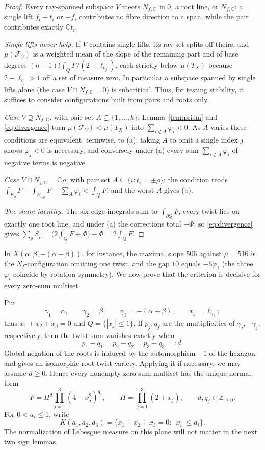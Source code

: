 \documentclass[11pt]{amsart}
\theoremstyle{definition}
\theoremstyle{remark}
\newcommand{\CC}{\mathbb{C}}
\newcommand{\ZZ}{\mathbb{Z}}
\begin{document}
\begin{proof}
Every ray-spanned subspace $V$ meets $N_{f,\CC}$ in $0$, a root line, or
$N_{f,\CC}$: a single lift $f_i + t_i$ or $-f_i$ contributes no fibre
direction to a span, while the pair contributes exactly $\CC t_i$.

\emph{Single lifts never help.} If $V$ contains single lifts, its ray
set splits off theirs, and $\mu(\mathcal{F}_V)$ is a weighted mean of
the slope of the remaining part and of base degrees
$(n-1)!\int_Q F/(2+\ell_{t_j})$, each strictly below $\mu(T_X)$ because
$2 + \ell_{t_j} > 1$ off a set of measure zero. In particular a subspace
spanned by single lifts alone (the case $V \cap N_{f,\CC} = 0$) is
subcritical. Thus, for testing stability, it suffices to consider
configurations built from pairs and roots only.

\emph{Case $V \supseteq N_{f,\CC}$,} with pair set
$A \subsetneq \{1, \dots, k\}$: Lemma~\ref{lem:prism} and
\eqref{eq:divergence} turn $\mu(\mathcal{F}_V) < \mu(T_X)$ into
$\sum_{i \notin A} \varphi_i < 0$. As $A$ varies these conditions are
equivalent, termwise, to (a): taking $A$ to omit a single index $j$
shows $\varphi_j < 0$ is necessary, and conversely under (a) every sum
$\sum_{i \notin A} \varphi_i$ of negative terms is negative.

\emph{Case $V \cap N_{f,\CC} = \CC\rho$,} with pair set
$A \subseteq \{i : t_i = \pm\rho\}$: the condition reads
$\int_{E_\rho}F + \int_{E_{-\rho}}F - \sum_{A}\varphi_i < \int_Q F$, and
the worst $A$ gives (b).

\emph{The share identity.} The six edge integrals sum to
$\int_{\partial Q} F$, every twist lies on exactly one root line, and
under (a) the corrections total $-\Phi$; so \eqref{eq:divergence} gives
$\sum_\rho S_\rho = \bigl(2\int_Q F + \Phi\bigr) - \Phi = 2\int_Q F$.
\end{proof}

In $X(\alpha, \beta, -(\alpha{+}\beta))$, for instance, the maximal slope
$506$ against $\mu = 516$ is the $N_f$-configuration omitting one twist,
and the gap $10$ equals $-6\varphi_1$ (the three $\varphi_i$ coincide by
rotation symmetry). We now prove that the criterion is decisive for every
zero-sum multiset.

Put
\[
 \gamma_1=\alpha,\qquad \gamma_2=\beta,\qquad
 \gamma_3=-(\alpha+\beta),\qquad x_j=\ell_{\gamma_j};
\]
thus $x_1+x_2+x_3=0$ and $Q=\{|x_j|\le1\}$. If $p_j,q_j$ are the
multiplicities of $\gamma_j,-\gamma_j$, respectively, then the twist sum
vanishes exactly when
\[
 p_1-q_1=p_2-q_2=p_3-q_3=:d.
\]
Global negation of the roots is induced by the automorphism $-1$ of the
hexagon and gives an isomorphic root-twist variety. Applying it if necessary,
we may assume $d\ge0$. Hence
every nonempty zero-sum multiset has the unique normal form
\begin{equation}\label{eq:zerosum-normal}
 F=H^d\prod_{j=1}^3(4-x_j^2)^{q_j},\qquad
 H=\prod_{j=1}^3(2+x_j),\qquad d,q_j\in\ZZ_{\ge0}.
\end{equation}
For $0<a_i\le1$, write
\[
 K(a_1,a_2,a_3)=\{x_1+x_2+x_3=0:\ |x_i|\le a_i\}.
\]
The normalization of Lebesgue measure on this plane will not matter in the
next two sign lemmas.
\end{document}
